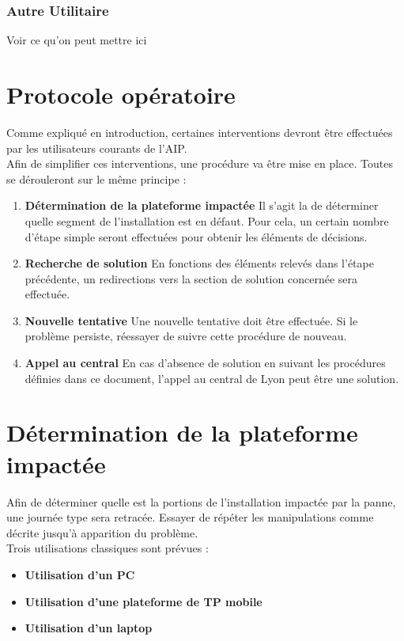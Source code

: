\documentclass[a4paper]{article}
\begin{document}
\subsubsection{Autre Utilitaire}
Voir ce qu'on peut mettre ici


\section{Protocole opératoire}

Comme expliqué en introduction, certaines interventions devront être effectuées par les utilisateurs courants de l'AIP.\\
Afin de simplifier ces interventions, une procédure va être mise en place. Toutes se dérouleront sur le même principe : 
\begin{enumerate}
	\item \textbf{Détermination de la plateforme impactée} Il s'agit la de déterminer quelle segment de l'installation est en défaut. Pour cela, un certain nombre d'étape simple seront effectuées pour obtenir les éléments de décisions.
	\item \textbf{Recherche de solution} En fonctions des éléments relevés dans l'étape précédente, un redirections vers la section de solution concernée sera effectuée.
	\item \textbf{Nouvelle tentative} Une nouvelle tentative doit être effectuée. Si le problème persiste, réessayer de suivre cette procédure de nouveau.
	\item \textbf{Appel au central} En cas d'absence de solution en suivant les procédures définies dans ce document, l'appel au central de Lyon peut être une solution.
\end{enumerate}

\section{Détermination de la plateforme impactée}
Afin de déterminer quelle est la portions de l'installation impactée par la panne, une journée type sera retracée. Essayer de répéter les manipulations comme décrite jusqu'à apparition du problème.\\
Trois utilisations classiques sont prévues : 
\begin{itemize}
	\item \textbf{Utilisation d'un PC}
	\item \textbf{Utilisation d'une plateforme de TP mobile}
	\item \textbf{Utilisation d'un laptop}
\end{itemize}
\end{document}
